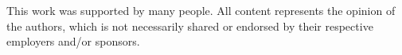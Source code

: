 \documentclass[sigconf,natbib,screen=true,review=true,anonymous]{acmart}
\begin{document}










\begin{acks}
 This work was supported by many people.
 All content represents the opinion of the authors, which is not necessarily shared or endorsed by their respective employers and/or sponsors.
\end{acks}



\end{document}
